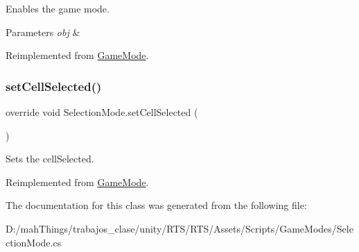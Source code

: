Enables the game mode. 


\begin{DoxyParams}{Parameters}
{\em obj} & \\
\hline
\end{DoxyParams}


Reimplemented from \mbox{\hyperlink{class_game_mode_ac6701d024e8ab5bf8a8876618a6fd01f}{Game\+Mode}}.

\mbox{\label{class_selection_mode_a2abd35e0ae4625320cb5ee5b35e3d759}} 
\subsubsection{\texorpdfstring{set\+Cell\+Selected()}{setCellSelected()}}
{\footnotesize\ttfamily override void Selection\+Mode.\+set\+Cell\+Selected (\begin{DoxyParamCaption}{ }\end{DoxyParamCaption})\hspace{0.3cm}{\ttfamily [virtual]}}



Sets the cell\+Selected. 



Reimplemented from \mbox{\hyperlink{class_game_mode_af0110e3ce61ccc4d2f77d64ffb9eeecf}{Game\+Mode}}.



The documentation for this class was generated from the following file\+:\begin{DoxyCompactItemize}
\item 
D\+:/mah\+Things/trabajos\+\_\+clase/unity/\+R\+T\+S/\+R\+T\+S/\+Assets/\+Scripts/\+Game\+Modes/Selection\+Mode.\+cs\end{DoxyCompactItemize}

